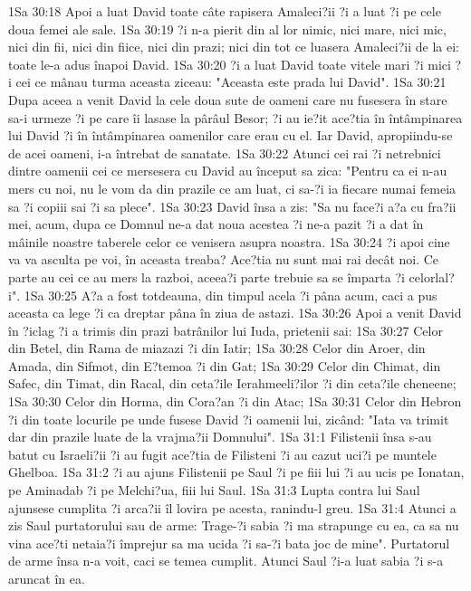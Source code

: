 1Sa 30:18  Apoi a luat David toate câte rapisera Amaleci?ii ?i a luat ?i pe cele doua femei ale sale.
1Sa 30:19  ?i n-a pierit din al lor nimic, nici mare, nici mic, nici din fii, nici din fiice, nici din prazi; nici din tot ce luasera Amaleci?ii de la ei: toate le-a adus înapoi David.
1Sa 30:20  ?i a luat David toate vitele mari ?i mici ?i cei ce mânau turma aceasta ziceau: "Aceasta este prada lui David".
1Sa 30:21  Dupa aceea a venit David la cele doua sute de oameni care nu fusesera în stare sa-i urmeze ?i pe care îi lasase la pârâul Besor; ?i au ie?it ace?tia în întâmpinarea lui David ?i în întâmpinarea oamenilor care erau cu el. Iar David, apropiindu-se de acei oameni, i-a întrebat de sanatate.
1Sa 30:22  Atunci cei rai ?i netrebnici dintre oamenii cei ce mersesera cu David au început sa zica: "Pentru ca ei n-au mers cu noi, nu le vom da din prazile ce am luat, ci sa-?i ia fiecare numai femeia sa ?i copiii sai ?i sa plece".
1Sa 30:23  David însa a zis: "Sa nu face?i a?a cu fra?ii mei, acum, dupa ce Domnul ne-a dat noua acestea ?i ne-a pazit ?i a dat în mâinile noastre taberele celor ce venisera asupra noastra.
1Sa 30:24  ?i apoi cine va va asculta pe voi, în aceasta treaba? Ace?tia nu sunt mai rai decât noi. Ce parte au cei ce au mers la razboi, aceea?i parte trebuie sa se împarta ?i celorlal?i".
1Sa 30:25  A?a a fost totdeauna, din timpul acela ?i pâna acum, caci a pus aceasta ca lege ?i ca dreptar pâna în ziua de astazi.
1Sa 30:26  Apoi a venit David în ?iclag ?i a trimis din prazi batrânilor lui Iuda, prietenii sai:
1Sa 30:27  Celor din Betel, din Rama de miazazi ?i din Iatir;
1Sa 30:28  Celor din Aroer, din Amada, din Sifmot, din E?temoa ?i din Gat;
1Sa 30:29  Celor din Chimat, din Safec, din Timat, din Racal, din ceta?ile Ierahmeeli?ilor ?i din ceta?ile cheneene;
1Sa 30:30  Celor din Horma, din Cora?an ?i din Atac;
1Sa 30:31  Celor din Hebron ?i din toate locurile pe unde fusese David ?i oamenii lui, zicând: "Iata va trimit dar din prazile luate de la vrajma?ii Domnului".
1Sa 31:1  Filistenii însa s-au batut cu Israeli?ii ?i au fugit ace?tia de Filisteni ?i au cazut uci?i pe muntele Ghelboa.
1Sa 31:2  ?i au ajuns Filistenii pe Saul ?i pe fiii lui ?i au ucis pe Ionatan, pe Aminadab ?i pe Melchi?ua, fiii lui Saul.
1Sa 31:3  Lupta contra lui Saul ajunsese cumplita ?i arca?ii îl lovira pe acesta, ranindu-l greu.
1Sa 31:4  Atunci a zis Saul purtatorului sau de arme: Trage-?i sabia ?i ma strapunge cu ea, ca sa nu vina ace?ti netaia?i împrejur sa ma ucida ?i sa-?i bata joc de mine". Purtatorul de arme însa n-a voit, caci se temea cumplit. Atunci Saul ?i-a luat sabia ?i s-a aruncat în ea.
